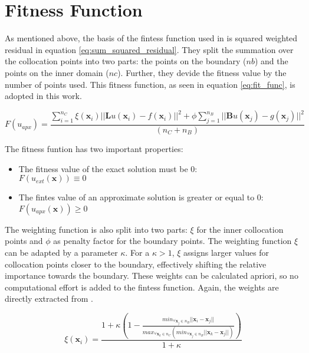 \documentclass[./\jobname.tex]{subfiles}
\begin{document}
\section{Fitness Function}
\label{chap:fit_func}

As mentioned above, the basis of the fintess function used in \cite{chaquet_using_2019} is squared weighted residual in equation \ref{eq:sum_squared_residual}. They split the summation over the collocation points into two parts: the points on the boundary ($nb$) and the points on the inner domain ($nc$). Further, they devide the fitness value by the number of points used. This fitness function, as seen in equation \ref{eq:fit_func}, is adopted in this work. 

\begin{equation}
\label{eq:fit_func}
F(u_{apx}) = \frac{\sum_{i=1}^{n_C} \xi (\mathbf{x}_i) || \mathbf{L}u(\mathbf{x}_i) - f(\mathbf{x}_i)||^2 + \phi \sum_{j=1}^{n_B} || \mathbf{B}u(\mathbf{x}_j) - g(\mathbf{x}_j)||^2}{(n_C + n_B)}  
\end{equation}

The fitness funtion has two important properties: 
\begin{itemize}
	\item The fitness value of the exact solution must be 0:\\
	$F(u_{ext}(\mathbf{x})) \equiv 0$ 
	\item The fintes value of an approximate solution is greater or equal to 0: \\
	$F(u_{apx}(\mathbf{x})) \geq 0$
\end{itemize}
 

The weighting function is also split into two parts: $\xi$ for the inner collocation points and $\phi$ as penalty factor for the boundary points. The weighting function $\xi$ can be adapted by a parameter $\kappa$. For a $\kappa > 1$, $\xi$ assigns larger values for collocation points closer to the boundary, effectively shifting the relative importance towards the boundary. These weights can be calculated apriori, so no computational effort is added to the fintess function. Again, the weights are directly extracted from \cite{chaquet_using_2019}. 

\begin{equation}
\label{eq:nc_weight}
\xi(\mathbf{x}_i) = \frac{1 + \kappa \left(1 - \frac{min_{\forall \mathbf{x}_j\in n_B}|| \mathbf{x}_i - \mathbf{x}_j ||}{max_{\forall\mathbf{x}_k \in n_C}(min_{\forall \mathbf{x}_j \in n_B} || \mathbf{x}_k - \mathbf{x}_j ||)}\right)}{1 + \kappa}
\end{equation}
\end{document}

